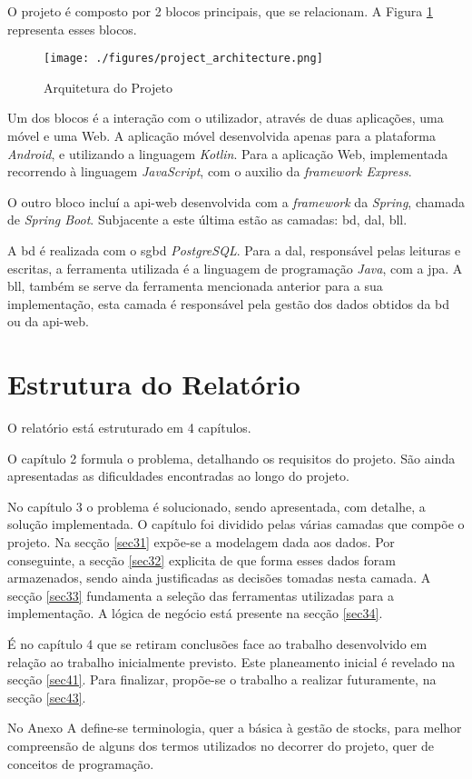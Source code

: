 O projeto é composto por 2 blocos principais, que se relacionam. A Figura \ref{project-architecture} representa esses blocos. 

\begin{figure}[H]
	\centering
	\texttt{[image: ./figures/project\_architecture.png]}
	\caption{Arquitetura do Projeto}
	\label{project-architecture}
\end{figure}

Um dos blocos é a interação com o utilizador, através de duas aplicações, uma móvel e uma Web. A aplicação móvel desenvolvida apenas para a plataforma \textit{Android}, e utilizando a linguagem \textit{Kotlin}. Para a aplicação Web, implementada recorrendo à linguagem \textit{JavaScript}, com o auxilio da \textit{framework Express}. 

O outro bloco incluí a \gls{api-web} desenvolvida com a \textit{framework} da \textit{Spring}, chamada de \textit{Spring Boot}. Subjacente a este última estão as camadas: \acrfull{bd}, \acrfull{dal}, \acrfull{bll}.

A \acrshort{bd} é realizada com o \acrfull{sgbd} \textit{PostgreSQL}. Para a \acrfull{dal}, responsável pelas leituras e escritas, a ferramenta utilizada é a linguagem de programação \textit{Java}, com a \acrfull{jpa}. A \acrfull{bll}, também se serve da ferramenta mencionada anterior para a sua implementação, esta camada é responsável pela gestão dos dados obtidos da \acrshort{bd} ou da \gls{api-web}.


%
%
\section{Estrutura do Relatório} \label{sec14}
O relatório está estruturado em 4 capítulos.

O capítulo 2 formula o problema, detalhando os requisitos do projeto. São ainda apresentadas as dificuldades encontradas ao longo do projeto. 

No capítulo 3 o problema é solucionado, sendo apresentada, com detalhe, a solução implementada. O capítulo foi dividido pelas várias camadas que compõe o projeto. Na secção \ref{sec31} expõe-se a modelagem dada aos dados. Por conseguinte, a secção \ref{sec32} explicita de que forma esses dados foram armazenados, sendo ainda justificadas as decisões tomadas nesta camada. A secção \ref{sec33} fundamenta a seleção das ferramentas utilizadas para a implementação. A lógica de negócio está presente na secção \ref{sec34}. 

É no capítulo 4 que se retiram conclusões face ao trabalho desenvolvido em relação ao trabalho inicialmente previsto. Este planeamento inicial é revelado na secção \ref{sec41}. Para finalizar, propõe-se o trabalho a realizar futuramente, na secção \ref{sec43}.

No Anexo A define-se terminologia, quer a básica à gestão de stocks, para melhor compreensão de alguns dos termos utilizados no decorrer do projeto, quer de conceitos de programação.
